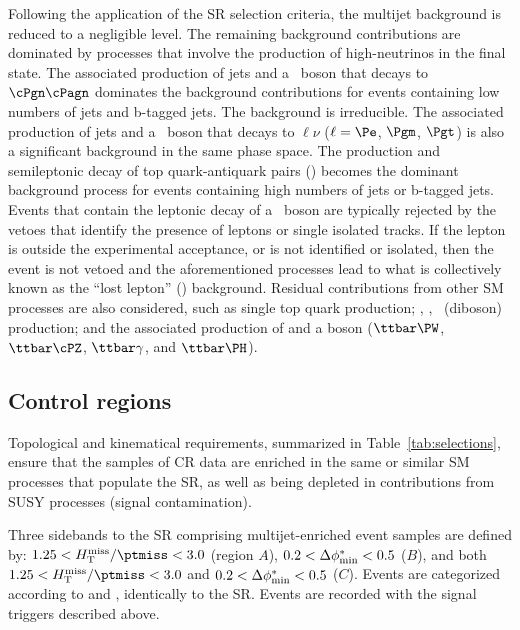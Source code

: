 Following the application of the SR selection criteria, the multijet
background is reduced to a negligible level. The remaining background
contributions are dominated by processes that involve the production
of high-\pt neutrinos in the final state. The associated production of
jets and a \cPZ\ boson that decays to $\cPgn\cPagn$ dominates the
background contributions for events containing low numbers of jets and
b-tagged jets. The \znunuj background is irreducible. The associated
production of jets and a \PW\ boson that decays to $\ell\nu$
($\ell=\Pe$, $\Pgm$, $\Pgt$) is also a significant background in the
same phase space. The production and semileptonic decay of top
quark-antiquark pairs (\ttbar) becomes the dominant background process
for events containing high numbers of jets or b-tagged jets. Events
that contain the leptonic decay of a \PW\ boson are typically rejected
by the vetoes that identify the presence of leptons or single isolated
tracks. If the lepton is outside the experimental acceptance, or is
not identified or isolated, then the event is not vetoed and the
aforementioned processes lead to what is collectively known as the
``lost lepton'' (\lost) background. Residual contributions from other
SM processes are also considered, such as single top quark production;
\PW\PW, \PW\cPZ, \cPZ\cPZ\ (diboson) production; and the associated
production of \ttbar and a boson ($\ttbar\PW$, $\ttbar\cPZ$,
$\ttbar\gamma$, and $\ttbar\PH$).

\subsection{Control regions}
\label{sec:control}

Topological and kinematical requirements, summarized in
Table~\ref{tab:selections}, ensure that the samples of CR data are
enriched in the same or similar SM processes that populate the SR, as
well as being depleted in contributions from SUSY processes (signal
contamination).

Three sidebands to the SR comprising multijet-enriched event samples
are defined by: $1.25 < \mhtmet < 3.0$ (region $A$), $0.2 < \Delta\phi^{*}_\text{min} <
0.5$ ($B$), and both $1.25 < \mhtmet < 3.0$ and $0.2 < \Delta\phi^{*}_\text{min} < 0.5$
($C$). Events are categorized according to \njet and \scalht,
identically to the SR. Events are recorded with the signal triggers
described above.

